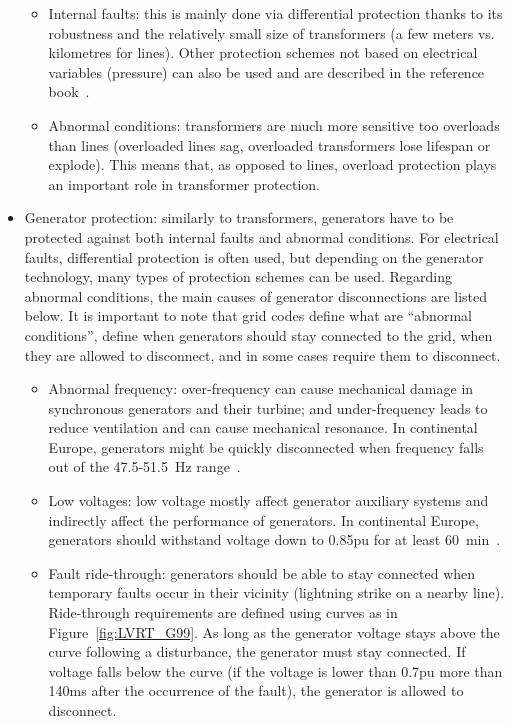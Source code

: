 \begin{itemize}
    \begin{itemize}
        \item Internal faults: this is mainly done via differential protection thanks to its robustness and the relatively small size of transformers (a few meters vs. kilometres for lines). Other protection schemes not based on electrical variables (\eg pressure) can also be used and are described in the reference book~\cite{HorowitzBook}.
        \item Abnormal conditions: transformers are much more sensitive too overloads than lines (overloaded lines sag, overloaded transformers lose lifespan or explode). This means that, as opposed to lines, overload protection plays an important role in transformer protection.
    \end{itemize}
    \item Generator protection: similarly to transformers, generators have to be protected against both internal faults and abnormal conditions. For electrical faults, differential protection is often used, but depending on the generator technology, many types of protection schemes can be used. Regarding abnormal conditions, the main causes of generator disconnections are listed below. It is important to note that grid codes define what are ``abnormal conditions'', \ie define when generators should stay connected to the grid, when they are allowed to disconnect, and in some cases require them to disconnect.
    \begin{itemize}
        \item Abnormal frequency: over-frequency can cause mechanical damage in synchronous generators and their turbine; and under-frequency leads to reduce ventilation and can cause mechanical resonance. In continental Europe, generators might be quickly disconnected when frequency falls out of the 47.5-51.5~Hz range~\cite{ENTSOEgeneratorRequirements}.
        \item Low voltages: low voltage mostly affect generator auxiliary systems and indirectly affect the performance of generators. In continental Europe, generators should withstand voltage down to 0.85pu for at least 60~min~\cite{ENTSOEgeneratorRequirements}.
        \item Fault ride-through: generators should be able to stay connected when temporary faults occur in their vicinity (\eg lightning strike on a nearby line). Ride-through requirements are defined using curves as in Figure~\ref{fig:LVRT_G99}. As long as the generator voltage stays above the curve following a disturbance, the generator must stay connected. If voltage falls below the curve (\eg if the voltage is lower than 0.7pu more than 140ms after the occurrence of the fault), the generator is allowed to disconnect.

\end{itemize}
\end{itemize}
